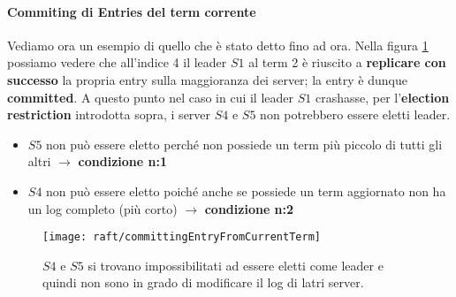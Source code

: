   \paragraph{Commiting di Entries del term corrente}
  Vediamo ora un esempio di quello che è stato detto fino ad ora. Nella figura \ref{fig:figure11} possiamo vedere che all'indice 4 il leader $S1$ al term 2 è riuscito a \textbf{replicare con successo} la propria entry sulla maggioranza dei server; la entry è dunque \textbf{committed}. A questo punto nel caso in cui il leader $S1$ crashasse, per l'\textbf{election restriction} introdotta sopra, i server $S4$ e $S5$ non potrebbero essere eletti leader.\\
  \begin{itemize}
    \item {$S5$ non può essere eletto perché non possiede un term più piccolo di tutti gli altri $\rightarrow$ \textbf{condizione n:1}}
    \item{$S4$ non può essere eletto poiché anche se possiede un term aggiornato non ha un log completo (più corto) $\rightarrow$ \textbf{condizione n:2} }
  \end{itemize}


  \begin{figure}[H]
    \centering
    \texttt{[image: raft/committingEntryFromCurrentTerm]}
    \caption[stateDiagramCaption]{$S4$ e $S5$ si trovano impossibilitati ad essere eletti come leader e quindi non sono in grado di modificare il log di latri server.}
    \label{fig:figure11}
  \end{figure}

